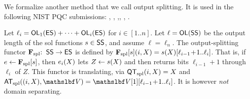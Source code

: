 %

%

 We formalize another method that we call output splitting. It is used in the following NIST PQC submissions: , , ,, , .

 Let $\ell_i = \mathsf{OL}_1(\mathsf{ES}) + \cdots + \mathsf{OL}_{i}(\mathsf{ES})$ for $i\in [1..n]$. Let $\ell = \mathsf{OL}(\mathsf{SS})$ be the output length of the sol functions $s \in  \mathsf{SS}$, and assume $\ell = \ell_n$. The output-splitting functor $\mathbf{F}_{\mathrm{spl}} {:\;\;} \mathsf{SS} \to \mathsf{ES}$ is defined by $\mathbf{F}_{\mathrm{spl}}[s](i,X) = s(X)[\ell_{i-1}\!+\!1 .. \ell_{i}]$. That is, if $e \gets \mathbf{F}_{\mathrm{spl}}[s]$, then $e_i(X)$ lets $Z \gets s(X)$ and then returns bits $\ell_{i-1}\!+\!1$ through $\ell_{i}$ of $Z$. This functor is translating, via $\mathsf{QT}_{\mathrm{spl}}(i,X)=X$ and $\SplittinganswerRO((i,X),\vecV)=\vecV[1][\ell_{i-1}\!+\!1 .. \ell_{i}]$. It is however \textit{not} domain separating. 

